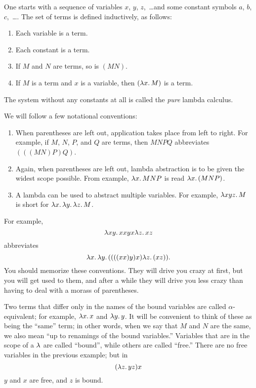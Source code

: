 \documentclass[../../include/open-logic-section]{subfiles}
\begin{document}

One starts with a sequence of variables $x$, $y$, $z$,~\dots and some
constant symbols $a$, $b$, $c$,~\dots.  The set of terms is defined
inductively, as follows:
\begin{enumerate}
\item Each variable is a term.
\item Each constant is a term.
\item If $M$ and $N$ are terms, so is $(MN)$.
\item If $M$ is a term and $x$ is a variable, then $(\lambd[x][M])$ is a
  term.
\end{enumerate}
The system without any constants at all is called the \emph{pure}
lambda calculus.

We will follow a few notational conventions:
\begin{enumerate}
\item When parentheses are left out, application takes place from left
  to right. For example, if $M$, $N$, $P$, and $Q$ are terms, then
  $MNPQ$ abbreviates $(((MN)P)Q)$.
\item Again, when parentheses are left out, lambda abstraction is to
  be given the widest scope possible. From example, $\lambd[x][MNP]$ is
  read $\lambd[x][(MNP)]$.
\item A lambda can be used to abstract multiple variables. For
  example, $\lambd[xyz][M]$ is short for
  $\lambd[x][\lambd[y][\lambd[z][M]]]$.
\end{enumerate}

For example,
\[
\lambd[xy][xxyx \lambd[z][xz]]
\]
abbreviates
\[
\lambd[x][\lambd[y][((((xx)y)x) \lambd[z][(xz)])]].
\]
You should memorize these conventions. They will drive you crazy at
first, but you will get used to them, and after a while they will
drive you less crazy than having to deal with a morass of parentheses.

Two terms that differ only in the names of the bound variables are
called $\alpha$-equivalent; for example, $\lambd[x][x]$ and
$\lambd[y][y]$. It will be convenient to think of these as being the
``same'' term; in other words, when we say that $M$ and $N$ are the
same, we also mean ``up to renamings of the bound variables.''
Variables that are in the scope of a $\lambd$ are called ``bound'',
while others are called ``free.'' There are no free variables in the
previous example; but in
\[
(\lambd[z][yz])x 
\]
$y$ and $x$ are free, and $z$ is bound.
\end{document}
